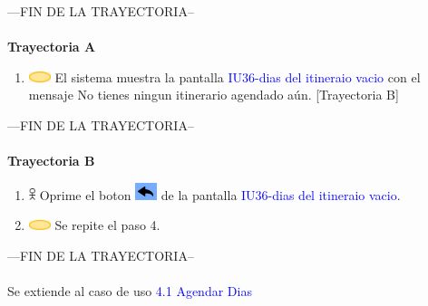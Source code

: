 ---FIN DE LA TRAYECTORIA--\\\\
\textbf{Trayectoria A}
    \begin{enumerate}
        \item \includegraphics[width=0.0500\textwidth]{Figuras/sistema.png} El sistema muestra la pantalla \textcolor{blue}{IU36-dias del itineraio vacio} con el mensaje No tienes ningun itinerario agendado aún. [Trayectoria B]
    \end{enumerate}
---FIN DE LA TRAYECTORIA--\\\\
\textbf{Trayectoria B}
    \begin{enumerate}
        \item \includegraphics[width=0.0150\textwidth]{Figuras/persona.png} Oprime el boton \includegraphics[width=0.05\textwidth]{ComponentesCU/back.PNG} de la pantalla \textcolor{blue}{IU36-dias del itineraio vacio}.
         \item \includegraphics[width=0.0500\textwidth]{Figuras/sistema.png} Se repite el paso 4.
    \end{enumerate}
---FIN DE LA TRAYECTORIA--\\\\
Se extiende al caso de uso \textcolor{blue}{4.1 Agendar Dias}
\newpage
